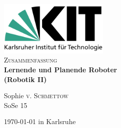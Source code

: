 \documentclass[11pt]{scrartcl}
\begin{document}
\begin{titlepage}

\begin{center}


\includegraphics[width=0.4\textwidth]{Logo_KIT.png}\\[1cm]    



\textsc{\Large Zusammenfassung}\\[0.5cm]


{ \huge \bfseries Lernende und Planende Roboter}\\[0.4cm]
{ \large \bfseries (Robotik II)}
\bigskip


Sophie \textsc{v. Schmettow}\\
SoSe 15\\




\vfill

{\large \today{} in Karlsruhe} 

\end{center}


\end{titlepage}


\tableofcontents
\newpage


\end{document}
